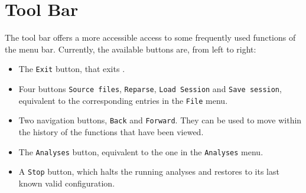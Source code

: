 \section{Tool Bar}\label{sec:toolbar}

The tool bar offers a more accessible access to some frequently used
functions of the menu bar.  Currently, the available buttons are, from left
to right:
\begin{itemize}
\item The \texttt{Exit} button, that exits \FramaC.

\item Four buttons \texttt{Source files}, \texttt{Reparse},
  \texttt{Load Session} and \texttt{Save session}, equivalent to the
  corresponding entries in the \texttt{File} menu.

\item Two navigation buttons, \texttt{Back} and \texttt{Forward}. They can
  be used to move within the history of the functions that have been viewed.

\item The \texttt{Analyses} button, equivalent to the one in the
  \texttt{Analyses} menu.

\item A \texttt{Stop} button, which halts the running
  analyses and restores \FramaC to its last known valid configuration.

\end{itemize}
